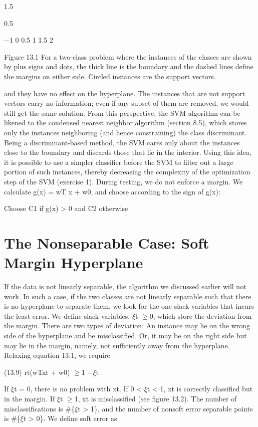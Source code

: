 1.5

0.5

$-$1 0 0.5 1 1.5 2

Figure 13.1 For a two-class problem where the instances of the classes are shown by plus signs and dots, the thick line is the boundary and the dashed lines define the margins on either side. Circled instances are the support vectors.

and they have no effect on the hyperplane. The instances that are not support vectors carry no information; even if any subset of them are removed, we would still get the same solution. From this perspective, the SVM algorithm can be likened to the condensed nearest neighbor algorithm (section 8.5), which stores only the instances neighboring (and hence constraining) the class discriminant. Being a discriminant-based method, the SVM cares only about the instances close to the boundary and discards those that lie in the interior. Using this idea, it is possible to use a simpler classifier before the SVM to filter out a large portion of such instances, thereby decreasing the complexity of the optimization step of the SVM (exercise 1). During testing, we do not enforce a margin. We calculate g(x) = wT x + w0, and choose according to the sign of g(x):

Choose C1 if g(x) > 0 and C2 otherwise

\section{The Nonseparable Case: Soft Margin Hyperplane}

If the data is not linearly separable, the algorithm we discussed earlier will not work. In such a case, if the two classes are not linearly separable such that there is no hyperplane to separate them, we look for the one slack variables that incurs the least error. We define slack variables, $\xi$t $\geq$0, which store the deviation from the margin. There are two types of deviation: An instance may lie on the wrong side of the hyperplane and be misclassified. Or, it may be on the right side but may lie in the margin, namely, not sufficiently away from the hyperplane. Relaxing equation 13.1, we require

(13.9) rt(wTxt + w0) $\geq$1 $-$$\xi$t

If $\xi$t = 0, there is no problem with xt. If 0 < $\xi$t < 1, xt is correctly classified but in the margin. If $\xi$t $\geq$1, xt is misclassified (see figure 13.2). The number of misclassifications is \#\{$\xi$t > 1\}, and the number of nonsoft error separable points is \#\{$\xi$t > 0\}. We define soft error as

